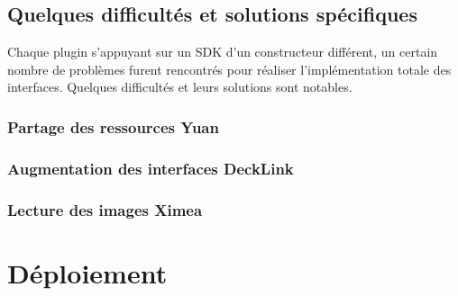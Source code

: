 \subsection{Quelques difficultés et solutions spécifiques}
Chaque plugin s'appuyant sur un SDK d'un constructeur différent, un certain nombre
de problèmes furent rencontrés pour réaliser l'implémentation totale des interfaces.
Quelques difficultés et leurs solutions sont notables.\\

\subsubsection{Partage des ressources Yuan}

\subsubsection{Augmentation des interfaces DeckLink}

\subsubsection{Lecture des images Ximea}


\section{Déploiement}
